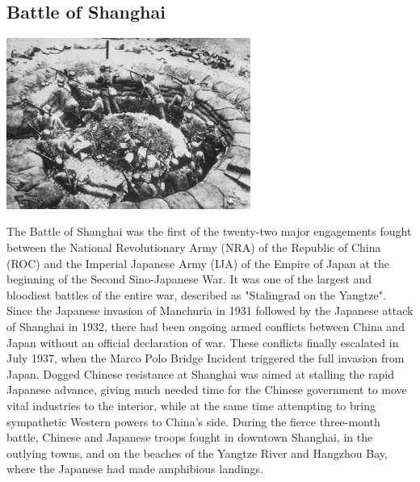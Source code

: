 \documentclass[11pt]{report}
\begin{document}
\subsection{Battle of Shanghai}
\vspace{2mm}\begin{center}\includegraphics[width=8cm]{./img/battleOfShanghai.jpg}\end{center}
The Battle of Shanghai was the first of the twenty-two major engagements fought between the National Revolutionary Army (NRA) of the Republic of China (ROC) and the Imperial Japanese Army (IJA) of the Empire of Japan at the beginning of the Second Sino-Japanese War. It was one of the largest and bloodiest battles of the entire war, described as "Stalingrad on the Yangtze".\\
\indent Since the Japanese invasion of Manchuria in 1931 followed by the Japanese attack of Shanghai in 1932, there had been ongoing armed conflicts between China and Japan without an official declaration of war. These conflicts finally escalated in July 1937, when the Marco Polo Bridge Incident triggered the full invasion from Japan. Dogged Chinese resistance at Shanghai was aimed at stalling the rapid Japanese advance, giving much needed time for the Chinese government to move vital industries to the interior, while at the same time attempting to bring sympathetic Western powers to China's side. During the fierce three-month battle, Chinese and Japanese troops fought in downtown Shanghai, in the outlying towns, and on the beaches of the Yangtze River and Hangzhou Bay, where the Japanese had made amphibious landings.
\section{}
\end{document}
